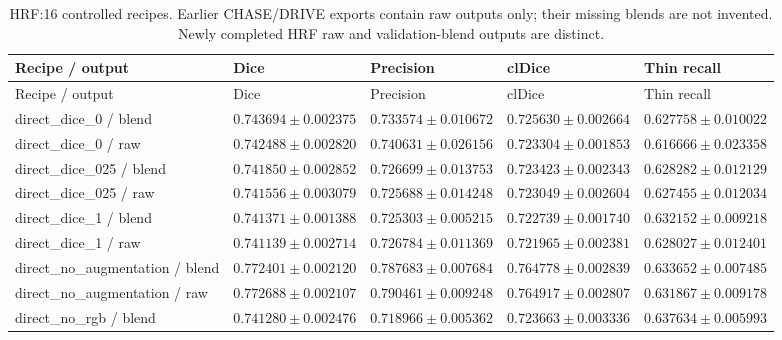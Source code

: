 \documentclass[jimaging,article,submit,pdftex,moreauthors]{Definitions/mdpi}
\begin{document}
\begingroup\scriptsize\setlength{\tabcolsep}{3pt}\renewcommand{\arraystretch}{1.12}\setlength{\LTleft}{-\extralength}\setlength{\LTright}{0pt plus1fill}\setlength{\LTcapwidth}{\dimexpr 15.000cm+24pt\relax}\captionsetup[longtable]{margin=0pt,width=\LTcapwidth,singlelinecheck=false,justification=raggedright}\makeatletter\long{}\makeatother
\begin{longtable}{@{}>{\raggedright\arraybackslash}p{5.0cm}>{\raggedright\arraybackslash}p{2.5cm}>{\raggedright\arraybackslash}p{2.5cm}>{\raggedright\arraybackslash}p{2.5cm}>{\raggedright\arraybackslash}p{2.5cm}@{}}
\caption{HRF:16 controlled recipes. Earlier CHASE/DRIVE exports contain raw outputs only; their missing blends are not invented. Newly completed HRF raw and validation-blend outputs are distinct.}\label{tab:controls-HRF}\\
\toprule
Recipe / output & Dice & Precision & clDice & Thin recall\\
\midrule\endfirsthead
\toprule
Recipe / output & Dice & Precision & clDice & Thin recall\\
\midrule\endhead
\bottomrule\endfoot
direct\_dice\_0 / blend & $0.743694\pm 0.002375$ & $0.733574\pm 0.010672$ & $0.725630\pm 0.002664$ & $0.627758\pm 0.010022$\\
direct\_dice\_0 / raw & $0.742488\pm 0.002820$ & $0.740631\pm 0.026156$ & $0.723304\pm 0.001853$ & $0.616666\pm 0.023358$\\
direct\_dice\_025 / blend & $0.741850\pm 0.002852$ & $0.726699\pm 0.013753$ & $0.723423\pm 0.002343$ & $0.628282\pm 0.012129$\\
direct\_dice\_025 / raw & $0.741556\pm 0.003079$ & $0.725688\pm 0.014248$ & $0.723049\pm 0.002604$ & $0.627455\pm 0.012034$\\
direct\_dice\_1 / blend & $0.741371\pm 0.001388$ & $0.725303\pm 0.005215$ & $0.722739\pm 0.001740$ & $0.632152\pm 0.009218$\\
direct\_dice\_1 / raw & $0.741139\pm 0.002714$ & $0.726784\pm 0.011369$ & $0.721965\pm 0.002381$ & $0.628027\pm 0.012401$\\
direct\_no\_augmentation / blend & $0.772401\pm 0.002120$ & $0.787683\pm 0.007684$ & $0.764778\pm 0.002839$ & $0.633652\pm 0.007485$\\
direct\_no\_augmentation / raw & $0.772688\pm 0.002107$ & $0.790461\pm 0.009248$ & $0.764917\pm 0.002807$ & $0.631867\pm 0.009178$\\
direct\_no\_rgb / blend & $0.741280\pm 0.002476$ & $0.718966\pm 0.005362$ & $0.723663\pm 0.003336$ & $0.637634\pm 0.005993$\\

\end{longtable}
\end{document}
